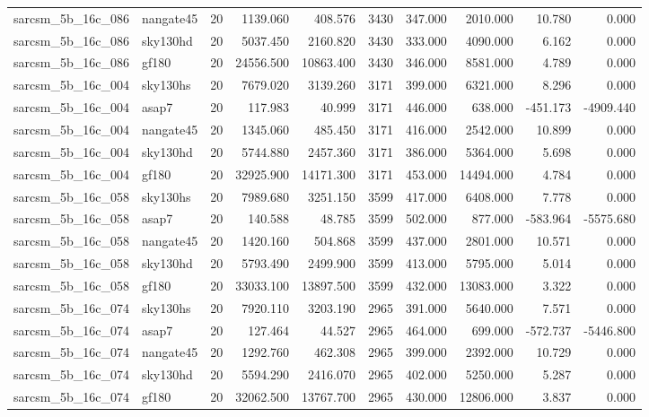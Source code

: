 \documentclass{article}
\begin{document}
\begin{longtable}{llrrrrrrrr}
sarcsm\_5b\_16c\_086 & nangate45 & 20 & 1139.060 & 408.576 & 3430 & 347.000 & 2010.000 & 10.780 & 0.000 \\
sarcsm\_5b\_16c\_086 & sky130hd & 20 & 5037.450 & 2160.820 & 3430 & 333.000 & 4090.000 & 6.162 & 0.000 \\
sarcsm\_5b\_16c\_086 & gf180 & 20 & 24556.500 & 10863.400 & 3430 & 346.000 & 8581.000 & 4.789 & 0.000 \\
sarcsm\_5b\_16c\_004 & sky130hs & 20 & 7679.020 & 3139.260 & 3171 & 399.000 & 6321.000 & 8.296 & 0.000 \\
sarcsm\_5b\_16c\_004 & asap7 & 20 & 117.983 & 40.999 & 3171 & 446.000 & 638.000 & -451.173 & -4909.440 \\
sarcsm\_5b\_16c\_004 & nangate45 & 20 & 1345.060 & 485.450 & 3171 & 416.000 & 2542.000 & 10.899 & 0.000 \\
sarcsm\_5b\_16c\_004 & sky130hd & 20 & 5744.880 & 2457.360 & 3171 & 386.000 & 5364.000 & 5.698 & 0.000 \\
sarcsm\_5b\_16c\_004 & gf180 & 20 & 32925.900 & 14171.300 & 3171 & 453.000 & 14494.000 & 4.784 & 0.000 \\
sarcsm\_5b\_16c\_058 & sky130hs & 20 & 7989.680 & 3251.150 & 3599 & 417.000 & 6408.000 & 7.778 & 0.000 \\
sarcsm\_5b\_16c\_058 & asap7 & 20 & 140.588 & 48.785 & 3599 & 502.000 & 877.000 & -583.964 & -5575.680 \\
sarcsm\_5b\_16c\_058 & nangate45 & 20 & 1420.160 & 504.868 & 3599 & 437.000 & 2801.000 & 10.571 & 0.000 \\
sarcsm\_5b\_16c\_058 & sky130hd & 20 & 5793.490 & 2499.900 & 3599 & 413.000 & 5795.000 & 5.014 & 0.000 \\
sarcsm\_5b\_16c\_058 & gf180 & 20 & 33033.100 & 13897.500 & 3599 & 432.000 & 13083.000 & 3.322 & 0.000 \\
sarcsm\_5b\_16c\_074 & sky130hs & 20 & 7920.110 & 3203.190 & 2965 & 391.000 & 5640.000 & 7.571 & 0.000 \\
sarcsm\_5b\_16c\_074 & asap7 & 20 & 127.464 & 44.527 & 2965 & 464.000 & 699.000 & -572.737 & -5446.800 \\
sarcsm\_5b\_16c\_074 & nangate45 & 20 & 1292.760 & 462.308 & 2965 & 399.000 & 2392.000 & 10.729 & 0.000 \\
sarcsm\_5b\_16c\_074 & sky130hd & 20 & 5594.290 & 2416.070 & 2965 & 402.000 & 5250.000 & 5.287 & 0.000 \\
sarcsm\_5b\_16c\_074 & gf180 & 20 & 32062.500 & 13767.700 & 2965 & 430.000 & 12806.000 & 3.837 & 0.000 \\

\end{longtable}
\end{document}
